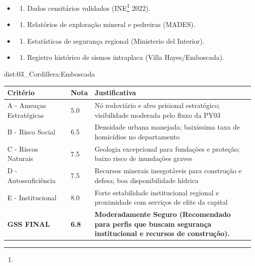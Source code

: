 {\begin{itemize}
\tightlist
\item
  \begin{enumerate}
  \def\labelenumi{\arabic{enumi})}
  \tightlist
  \item
    Dados censitários validados (INE\footnote{\fineINE} 2022).
  \end{enumerate}
\item
  \begin{enumerate}
  \def\labelenumi{\arabic{enumi})}
  \setcounter{enumi}{1}
  \tightlist
  \item
    Relatórios de exploração mineral e pedreiras (MADES).
  \end{enumerate}
\item
  \begin{enumerate}
  \def\labelenumi{\arabic{enumi})}
  \setcounter{enumi}{2}
  \tightlist
  \item
    Estatísticas de segurança regional (Ministerio del Interior).
  \end{enumerate}
\item
  \begin{enumerate}
  \def\labelenumi{\arabic{enumi})}
  \setcounter{enumi}{3}
  \tightlist
  \item
    Registro histórico de sismos intraplaca (Villa Hayes/\allowbreak Emboscada).
  \end{enumerate}
\end{itemize}}{dist:03_Cordillera:Emboscada}
\begin{table}[ht!]
\small \begin{tabular}{p{3.0cm}p{0.8cm}p{6.0cm}} \toprule
\textbf{Critério} & \textbf{Nota} & \textbf{Justificativa} \\ \midrule
A - Ameaças Estratégicas & 5.0 & Nó rodoviário e alvo prisional estratégico; visibilidade moderada pelo fluxo da PY03 \\
B - Risco Social & 6.5 & Densidade urbana manejada; baixíssima taxa de homicídios no departamento \\
C - Riscos Naturais & 7.5 & Geologia excepcional para fundações e proteção; baixo risco de inundações graves \\
D - Autossuficiência & 7.5 & Recursos minerais inesgotáveis para construção e defesa; boa disponibilidade hídrica \\
E - Institucional & 8.0 & Forte estabilidade institucional regional e proximidade com serviços de elite da capital \\
\midrule \textbf{GSS FINAL} & \textbf{6.8} & \textbf{Moderadamente Seguro (Recomendado para perfis que buscam segurança institucional e recursos de construção).} \\ \bottomrule \end{tabular}
\end{table}
